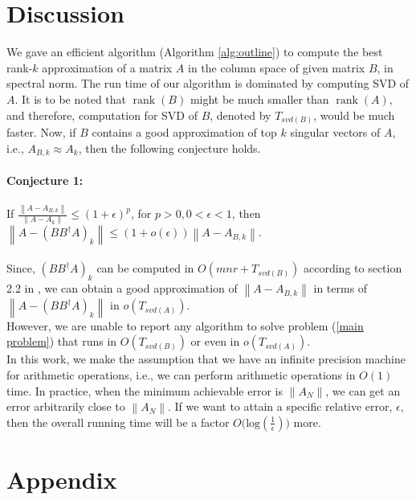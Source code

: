 \documentclass[11pt]{article}
\newcommand{\rank}{\operatorname{rank}}
\newcommand{\norm}[1]{\left\|#1\right\|}
\begin{document}
\section{Discussion}
We gave an efficient algorithm (Algorithm \ref{alg:outline}) to compute the best rank-$k$ approximation of a matrix $A$ in the column space of given matrix $B$, in spectral norm. The run time of our algorithm is dominated by computing SVD of $A$. It is to be noted that $\rank(B)$ might be much smaller than $\rank(A)$, and therefore, computation for SVD of $B$, denoted by $T_{svd(B)}$, would be much faster. Now, if $B$ contains a good approximation of top $k$ singular vectors of $A$, i.e., $A_{B, k} \approx A_k$, then the following conjecture holds.\\
\\
\textbf{Conjecture 1:}\\
\\
If $\frac{\norm{{A} - A_{B, k}}}{\norm{A - A_k}} \leq (1+\epsilon)^p$, for $p > 0, 0 < \epsilon < 1$, then
$\norm{{A} - {(BB^{\dagger}A)}_k} \leq (1+o(\epsilon))\norm{A - A_{B, k}}$. \\
\\
Since,  ${(BB^{\dagger}A)}_k$ can be computed in $O(mnr + T_{svd(B)})$ according to section 2.2 in \cite{BDM}, we can obtain a good approximation of $\norm{{A} - A_{B, k}}$ in terms of $\norm{{A} - {(BB^{\dagger}A)}_k}$ in $o(T_{svd(A)})$.\\
However, we are unable to report any algorithm to solve problem (\ref{main problem}) that runs in $O(T_{svd(B)})$ or even in $o(T_{svd(A)})$. \\
In this work, we make the assumption that we have an infinite precision machine for arithmetic operations, i.e., we can perform arithmetic operations in $O(1)$ time. In practice, when the minimum achievable error is $\norm{A_N}$, we can get an error arbitrarily close to $\norm{A_N}$. If we want to attain a specific relative error, $\epsilon$,  then the overall running time will be a factor $O\Big(\text{log}(\frac{1}{\epsilon})\Big)$ more.  


\section{Appendix}
\end{document}
